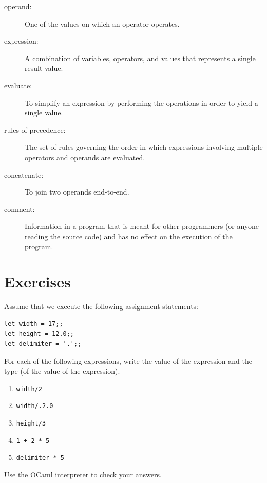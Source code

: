 \documentclass[10pt]{book}
\begin{document}
\begin{description}
\item[operand:]  One of the values on which an operator operates.

\item[expression:]  A combination of variables, operators, and values that
represents a single result value.

\item[evaluate:]  To simplify an expression by performing the operations
in order to yield a single value.

\item[rules of precedence:]  The set of rules governing the order in which
expressions involving multiple operators and operands are evaluated.

\item[concatenate:]  To join two operands end-to-end.

\item[comment:]  Information in a program that is meant for other
programmers (or anyone reading the source code) and has no effect on the
execution of the program.

\end{description}


\section{Exercises}

\begin{ex}
Assume that we execute the following assignment statements:

\begin{verbatim}
let width = 17;;
let height = 12.0;;
let delimiter = '.';;
\end{verbatim}

For each of the following expressions, write the value of the
expression and the type (of the value of the expression).

\begin{enumerate}

\item {\tt width/2}

\item {\tt width/.2.0}

\item {\tt height/3}

\item {\tt 1 + 2 * 5}

\item {\tt delimiter * 5}

\end{enumerate}

Use the OCaml interpreter to check your answers.
\end{ex}
\end{document}
